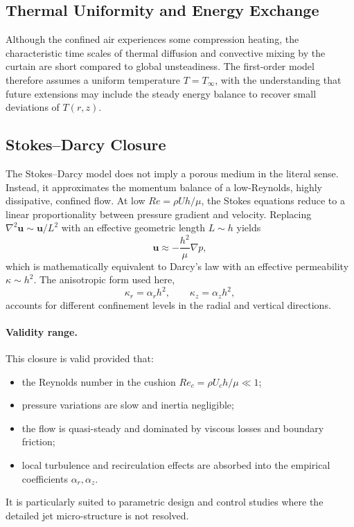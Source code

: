 \documentclass[11pt,a4paper]{article}
\begin{document}
\subsection{Thermal Uniformity and Energy Exchange}
Although the confined air experiences some compression heating, the characteristic time scales of thermal diffusion and convective mixing by the curtain are short compared to global unsteadiness. 
The first-order model therefore assumes a uniform temperature $T=T_\infty$, with the understanding that future extensions may include the steady energy balance to recover small deviations of $T(r,z)$.

\subsection{Stokes--Darcy Closure}
The Stokes--Darcy model does not imply a porous medium in the literal sense. 
Instead, it approximates the momentum balance of a low-Reynolds, highly dissipative, confined flow.
At low $Re=\rho U h/\mu$, the Stokes equations reduce to a linear proportionality between pressure gradient and velocity.
Replacing $\nabla^2\mathbf{u}\sim \mathbf{u}/L^2$ with an effective geometric length $L\sim h$ yields
\begin{equation}
  \mathbf{u}\approx-\frac{h^2}{\mu}\nabla p,
\end{equation}
which is mathematically equivalent to Darcy’s law with an effective permeability $\kappa\sim h^2$.
The anisotropic form used here,
\begin{equation}
  \kappa_r=\alpha_r h^2,\qquad \kappa_z=\alpha_z h^2,
\end{equation}
accounts for different confinement levels in the radial and vertical directions.

\paragraph{Validity range.} 
This closure is valid provided that:
\begin{itemize}
  \item the Reynolds number in the cushion $Re_c=\rho U_c h/\mu \ll 1$;
  \item pressure variations are slow and inertia negligible;
  \item the flow is quasi-steady and dominated by viscous losses and boundary friction;
  \item local turbulence and recirculation effects are absorbed into the empirical coefficients $\alpha_r,\alpha_z$.
\end{itemize}
It is particularly suited to parametric design and control studies where the detailed jet micro-structure is not resolved.
\end{document}
